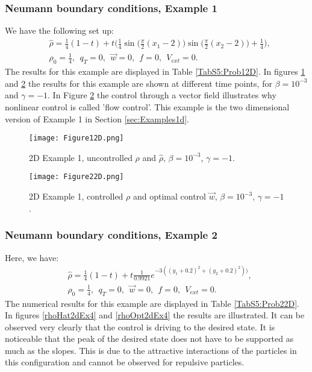 \subsubsection{Neumann boundary conditions, Example 1}	
We have the following set up:
\begin{align*}
&\widehat \rho = \frac{1}{4}(1-t) + t\bigg(\frac{1}{4}\sin \bigg(\frac{\pi}{2}(x_1 - 2)\bigg)\sin \bigg(\frac{\pi}{2}(x_2 - 2)\bigg) + \frac{1}{4}\bigg),\\
&\rho_0 = \frac{1}{4},\ \
q_{T} = 0,\ \
\vec{w} = 0,\ \
f =0,\ \
V_{ext} =0.
\end{align*}
The results for this example are displayed in Table \ref{TabS5:Prob12D}. In figures \ref{rhoHat2dEx2} and \ref{rhoOpt2dEx2} the results for this example are shown at different time points, for $\beta = 10^{-3}$ and $\gamma = -1$. In Figure \ref{rhoOpt2dEx2} the control through a vector field illustrates why nonlinear control is called 'flow control'. This example is the two dimensional version of Example 1 in Section \ref{sec:Examples1d}. 


\begin{figure}[h]
	\texttt{[image: Figure12D.png]}
	\caption{2D Example 1, uncontrolled $\rho$ and $\widehat \rho$, $\beta = 10^{-3}$, $\gamma = -1$.}
	\label{rhoHat2dEx2}
\end{figure}
\begin{figure}[h]
	\texttt{[image: Figure22D.png]}
	\caption{2D Example 1, controlled $\rho$ and optimal control $\vec{w}$, $\beta = 10^{-3}$, $\gamma = -1$.}
	\label{rhoOpt2dEx2}
\end{figure}


\subsubsection{Neumann boundary conditions, Example 2}	
Here, we have:
\begin{align*}
&\widehat \rho = \frac{1}{4}(1-t) + t\frac{1}{0.9921}e^{-3((y_1+0.2)^2 + (y_2+0.2)^2))},\\
&\rho_0 = \frac{1}{4},\ \
q_{T} = 0,\ \
\vec{w} = 0,\ \
f =0,\ \
V_{ext} =0.
\end{align*}
The numerical results for this example are displayed in Table \ref{TabS5:Prob22D}. In figures \ref{rhoHat2dEx4} and \ref{rhoOpt2dEx4} the results are illustrated. It can be observed very clearly that the control is driving to the desired state. It is noticeable that the peak of the desired state does not have to be supported as much as the slopes. This is due to the attractive interactions of the particles in this configuration and cannot be observed for repulsive particles.


